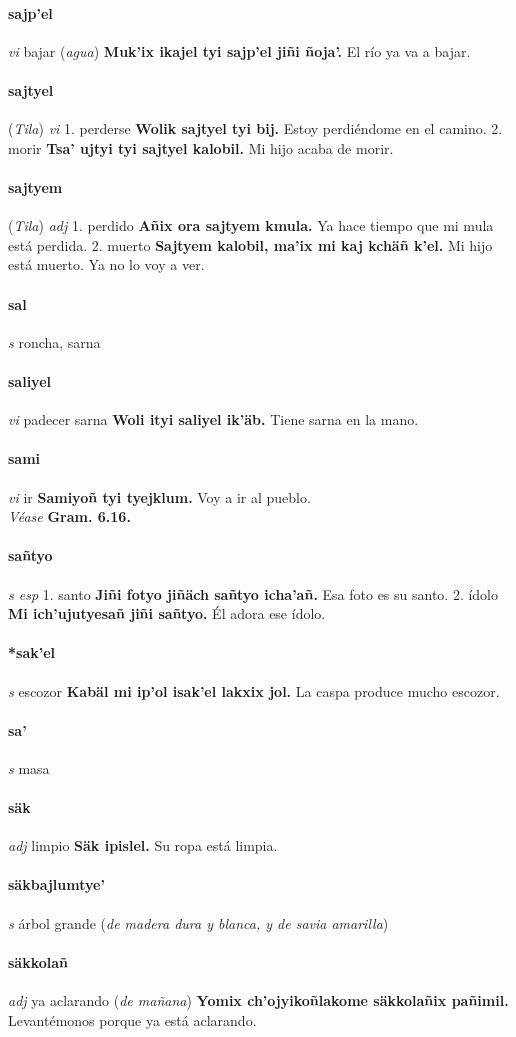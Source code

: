 \documentclass{scrbook}
\newcommand{\entry}[1]{\paragraph{#1}}
\newcommand{\onedefinition}[1]{#1.}
\newcommand{\partofspeech}[1]{\textit{#1}}
\newcommand{\spanishtranslation}[1]{#1}
\newcommand{\clarification}[1]{(\textit{#1})}
\newcommand{\cholexample}[1]{\textbf{#1}}
\newcommand{\exampletranslation}[1]{#1}
\newcommand{\alsosee}[1]{\\\textit{Véase} \textbf{#1}}
\newcommand{\relevantdialect}[1]{(\textit{#1})}
\begin{document}
\begin{multicols}{2}
\entry{sajp'el}
\partofspeech{vi}
\spanishtranslation{bajar}
\clarification{agua}
\cholexample{Muk'ix ikajel tyi sajp'el jiñi ñoja'.}
\exampletranslation{El río ya va a bajar.}

\entry{sajtyel}
\relevantdialect{Tila}
\partofspeech{vi}
\onedefinition{1}
\spanishtranslation{perderse}
\cholexample{Wolik sajtyel tyi bij.}
\exampletranslation{Estoy perdiéndome en el camino.}
\onedefinition{2}
\spanishtranslation{morir}
\cholexample{Tsa' ujtyi tyi sajtyel kalobil.}
\exampletranslation{Mi hijo acaba de morir.}

\entry{sajtyem}
\relevantdialect{Tila}
\partofspeech{adj}
\onedefinition{1}
\spanishtranslation{perdido}
\cholexample{Añix ora sajtyem kmula.}
\exampletranslation{Ya hace tiempo que mi mula está perdida.}
\onedefinition{2}
\spanishtranslation{muerto}
\cholexample{Sajtyem kalobil, ma'ix mi kaj kchäñ k'el.}
\exampletranslation{Mi hijo está muerto. Ya no lo voy a ver.}

\entry{sal}
\partofspeech{s}
\spanishtranslation{roncha, sarna}

\entry{saliyel}
\partofspeech{vi}
\spanishtranslation{padecer sarna}
\cholexample{Woli ityi saliyel ik'äb.}
\exampletranslation{Tiene sarna en la mano.}

\entry{sami}
\partofspeech{vi}
\spanishtranslation{ir}
\cholexample{Samiyoñ tyi tyejklum.}
\exampletranslation{Voy a ir al pueblo.}
\alsosee{Gram. 6.16.}

\entry{sañtyo}
\partofspeech{s esp}
\onedefinition{1}
\spanishtranslation{santo}
\cholexample{Jiñi fotyo jiñäch sañtyo icha'añ.}
\exampletranslation{Esa foto es su santo.}
\onedefinition{2}
\spanishtranslation{ídolo}
\cholexample{Mi ich'ujutyesañ jiñi sañtyo.}
\exampletranslation{Él adora ese ídolo.}

\entry{*sak'el}
\partofspeech{s}
\spanishtranslation{escozor}
\cholexample{Kabäl mi ip'ol isak'el lakxix jol.}
\exampletranslation{La caspa produce mucho escozor.}

\entry{sa'}
\partofspeech{s}
\spanishtranslation{masa}

\entry{säk}
\partofspeech{adj}
\spanishtranslation{limpio}
\cholexample{Säk ipislel.}
\exampletranslation{Su ropa está limpia.}

\entry{säkbajlumtye'}
\partofspeech{s}
\spanishtranslation{árbol grande}
\clarification{de madera dura y blanca, y de savia amarilla}

\entry{säkkolañ}
\partofspeech{adj}
\spanishtranslation{ya aclarando}
\clarification{de mañana}
\cholexample{Yomix ch'ojyikoñlakome säkkolañix pañimil.}
\exampletranslation{Levantémonos porque ya está aclarando.}


\end{multicols}
\end{document}
